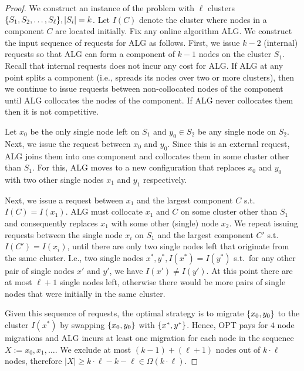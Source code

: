 \documentclass[manuscript,screen=true]{acmart}
\newcommand{\ALG}{ALG}
\newcommand{\PPOBRP}{PP-BRP}
\DeclarePairedDelimiter\set{\{}{\}}
\newcommand\maciek[1]{\color{brown}\textbf{\\ Maciek: #1}\color{black}}
\begin{document}
\begin{proof}
	We construct an instance of the problem with $\ell$ clusters 
	$\set{ S_1, S_2,\dots , S_{\ell}}, |S_i|  = k$.
	Let $I(C)$ denote the cluster where nodes in a component $C$ are located initially.
	Fix any online algorithm \ALG{}.
	We construct the input sequence of requests for \ALG{} as follows.
	First,
	we issue $k-2$ (internal) requests so that \ALG{} can form a component of $k-1$
	nodes on the cluster $S_1$.
	Recall that internal requests does not incur any cost for \ALG{}.
	If \ALG{} at any point splits a component
	(i.e., spreads its nodes over two or more clusters),
	then we continue to issue requests between non-collocated nodes of the component until \ALG{} collocates the nodes of the component.
	If \ALG{} never collocates them then it is not competitive.
	
	Let $x_0$  be the only single node left on $S_1$ and  $y_0 \in S_2$ be any single node on $S_2$.
	Next,
	we issue the request between $x_0$ and $y_0$.
	Since this is an external request,
	\ALG{} joins them into one component and collocates them in some cluster other than $S_1$.
	For this,
	\ALG{} moves to a new configuration
	that replaces $x_0$ and $y_0$ with two other single nodes $x_1$ and $y_1$ respectively.
	
	Next,
	we issue a request between $x_1$ and the largest component $C$ s.t.~$I(C) = I(x_1)$.
	\ALG{} must collocate $x_1$ and $C$ on some cluster other than $S_1$ and
	consequently replaces $x_1$ with some other (single) node $x_2$.
	We repeat issuing requests between the single node $x_i$ on $S_1$ and the largest component $C'$ s.t.~$I(C')=I(x_i)$,
	until there are only two single nodes left that  originate from the same cluster.
	I.e.,
	two single nodes $x^*, y^*,I(x^*) = I(y^*)$ s.t.~for any other pair of single nodes
	$x'$ and $y'$,
	we have $I(x') \neq I(y')$.
	At this point there are at most $\ell+1$ single nodes left,
	otherwise there would be more pairs of single nodes that were initially in the same cluster.
	
	Given this sequence of requests,
	the optimal strategy is to migrate $\set{x_0,y_0}$ to the cluster $I(x^*)$ by
	swapping $\set{x_0,y_0}$ with $\set{x^*,y^*}$.
	Hence,
	OPT pays for $4$ node migrations and
	\ALG{} incurs at least one migration for each node in the sequence $X := x_0, x_1,\dots$.
	We exclude at most $(k-1) + ( \ell+1)$ nodes out of $k \cdot \ell$ nodes,
	therefore $|X| \geq k \cdot \ell - k - \ell \in \Omega(k\cdot\ell)$.
\end{proof}
\end{document}
